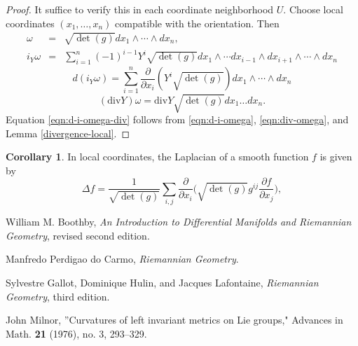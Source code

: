 \documentclass{amsart}
\numberwithin{equation}{section}
\theoremstyle{definition}
\theoremstyle{theorem}
\newtheorem{corollary}[definition]{Corollary}
\begin{document}
\begin{proof} It suffice to verify this in each coordinate neighborhood $U$. Choose local coordinates
$(x_1,\ldots,x_n)$ compatible with the orientation. Then
\begin{eqnarray*}
\omega &=&\sqrt{\det(g)} dx_1 \wedge \cdots \wedge dx_n,\\
i_Y \omega &=& \sum_{i=1}^n (-1)^{i-1} Y^i\sqrt{\det(g)} dx_1 \wedge \cdots dx_{i-1}\wedge dx_{i+1}\wedge \cdots \wedge dx_n 
\end{eqnarray*}
\begin{equation}\label{eqn:d-i-omega}
d(i_Y \omega) = \sum_{i=1}^n \frac{\partial}{\partial x_i}(Y^i\sqrt{\det(g)}) dx_1\wedge \cdots \wedge d x_n
\end{equation}
\begin{equation}\label{eqn:div-omega}
(\mathrm{\mathrm{div}}Y)\omega = \mathrm{div}Y \sqrt{\det(g)} dx_1\ldots dx_n. 
\end{equation}
Equation \eqref{eqn:d-i-omega-div} follows from \eqref{eqn:d-i-omega}, \eqref{eqn:div-omega}, and
Lemma \ref{divergence-local}.
\end{proof}

\begin{corollary} In local coordinates, the Laplacian of a smooth function $f$ is given by 
$$
\Delta f =\frac{1}{\sqrt{ \det(g) } }\sum_{i,j} \frac{\partial}{\partial x_i}
\Big( \sqrt{\det(g)} g^{ij}\frac{\partial f}{\partial x_j}\Big) ,
$$
\end{corollary}


\begin{thebibliography}{ABC}

 William M. Boothby, {\em An Introduction to Differential Manifolds and Riemannian Geometry}, revised second edition.

  Manfredo Perdigao do Carmo, {\em Riemannian Geometry}.

Sylvestre Gallot, Dominique Hulin, and Jacques Lafontaine, 
{\em Riemannian Geometry}, third edition.

John Milnor, ''Curvatures of left invariant metrics on Lie groups,"
Advances in Math. {\bf 21} (1976), no. 3, 293--329.


\end{thebibliography}
\end{document}
